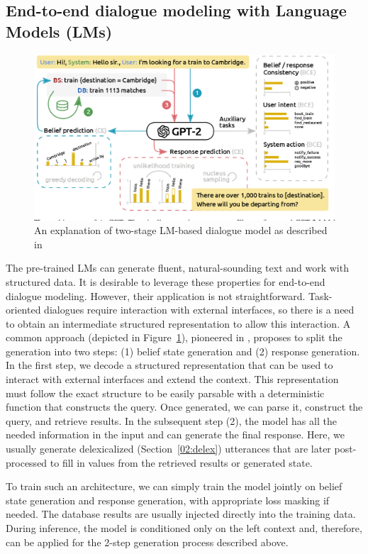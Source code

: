 \subsection{End-to-end dialogue modeling with Language Models (LMs)}
\label{background:2stage-lm-modeling}
\begin{figure}[h]
    \centering
    \includegraphics[width=\textwidth,trim={0 5px 0 0},clip]{images/augpt.png}
    \caption{An explanation of two-stage LM-based dialogue model as described in \citep{kulhanek-etal-2021-augpt}}
    \label{fig:augpt-2-stage}
\end{figure}
The pre-trained LMs can generate fluent, natural-sounding text and work with structured data.
It is desirable to leverage these properties for end-to-end dialogue modeling.
However, their application is not straightforward.
Task-oriented dialogues require interaction with external interfaces, so there is a need to obtain an intermediate structured representation 
to allow this interaction.
A common approach (depicted in Figure~\ref{fig:augpt-2-stage}), pioneered in \citep{lei2018sequicity}, proposes to split the generation into two steps: (1) belief state generation and (2) response generation.
In the first step, we decode a structured representation that can be used to interact with external interfaces and extend the context.
This representation must follow the exact structure to be easily parsable with a deterministic function that constructs the query.
Once generated, we can parse it, construct the query, and retrieve results.
In the subsequent step (2), the model has all the needed information in the input and can generate the final response.
Here, we usually generate delexicalized (Section~\ref{02:delex}) utterances that are later post-processed to fill in values from the retrieved results or generated state.

To train such an architecture, we can simply train the model jointly on belief state generation and response generation, with appropriate loss masking if needed.
The database results are usually injected directly into the training data.
During inference, the model is conditioned only on the left context and, therefore, can be applied for the 2-step generation process described above.


